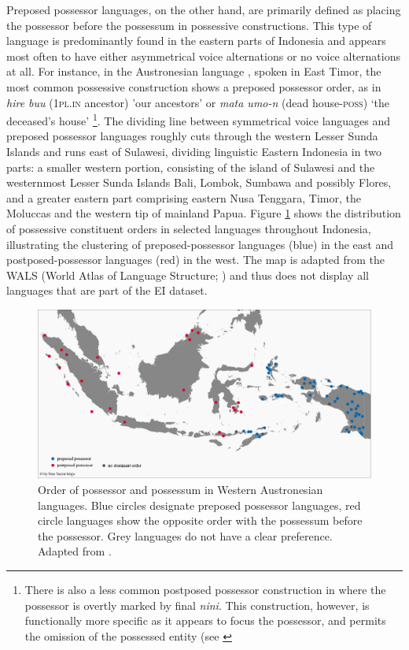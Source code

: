 Preposed possessor languages, on the other hand, are primarily defined as placing the possessor before the possessum in possessive constructions. This type of language is predominantly found in the eastern parts of Indonesia and appears most often to have either asymmetrical voice alternations or no voice alternations at all. For instance, in the Austronesian language , spoken in East Timor, the most common possessive construction shows a preposed possessor order, as in \textit{hire buu} (1\textsc{pl}.\textsc{in} ancestor) 'our ancestors' or \textit{mata umo-n} (dead house-\textsc{poss}) `the deceased's house' \citep[31]{bowden2006} \footnote{There is also a less common postposed possessor construction in  where the possessor is overtly marked by final \textit{nini}. This construction, however, is functionally more specific as it appears to focus the possessor, and permits the omission of the possessed entity (see \citealt[32]{bowden2006}}. The dividing line between symmetrical voice languages and preposed possessor languages roughly cuts through the western Lesser Sunda Islands and runs east of Sulawesi, dividing linguistic Eastern Indonesia in two parts: a smaller western portion, consisting of the island of Sulawesi and the westernmost Lesser Sunda Islands Bali, Lombok, Sumbawa and possibly Flores, and a greater eastern part comprising eastern Nusa Tenggara, Timor, the Moluccas and the western tip of mainland Papua. Figure \ref{figure:preposed} shows the distribution of possessive constituent orders in selected languages throughout Indonesia, illustrating the clustering of preposed-possessor languages (blue) in the east and postposed-possessor languages (red) in the west. The map is adapted from the WALS (World Atlas of Language Structure; \citealt{wals-86}) and thus does not display all languages that are part of the EI dataset.

\begin{figure}
\includegraphics[width=\columnwidth]{figures/Preposed_possessor.eps}
\caption[Order of possessor and possessum in Western Austronesian languages]{Order of possessor and possessum in Western Austronesian languages. Blue circles designate preposed possessor languages, red circle languages show the opposite order with the possessum before the possessor. Grey languages do not have a clear preference. Adapted from \citealt{wals-86}.}\label{figure:preposed}
\end{figure}

